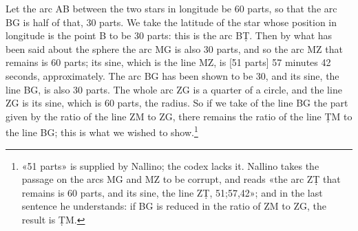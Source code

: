 \documentclass[11pt]{article}
\begin{document}
\par Let the arc AB between the two stars in longitude be 60 parts, so that the arc BG is half of that, 30 parts. We take the latitude of the star whose position in longitude is the point B to be 30 parts: this is the arc BṬ. Then by what has been said about the sphere the arc MG is also 30 parts, and so the arc MZ that remains is 60 parts; its sine, which is the line MZ, is [51 parts] 57 minutes 42 seconds, approximately. The arc BG has been shown to be 30, and its sine, the line BG, is also 30 parts. The whole arc ZG is a quarter of a circle, and the line ZG is its sine, which is 60 parts, the radius. So if we take of the line BG the part given by the ratio of the line ZM to ZG, there remains the ratio of the line ṬM to the line BG; this is what we wished to show.\footnote{«51 parts» is supplied by Nallino; the codex lacks it. Nallino takes the passage on the arcs MG and MZ to be corrupt, and reads «the arc ZṬ that remains is 60 parts, and its sine, the line ZṬ, 51;57,42»; and in the last sentence he understands: if BG is reduced in the ratio of ZM to ZG, the result is ṬM.}\par
\par\begin{center}\end{center}
\end{document}
